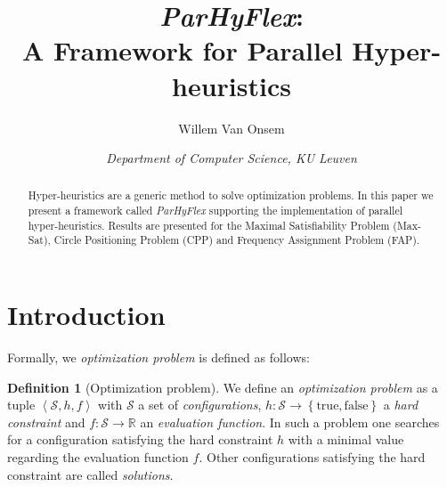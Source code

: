 \documentclass[a4paper,10pt]{article}
\title{\emph{ParHyFlex}:\\A Framework for Parallel Hyper-heuristics}
\author{Willem Van Onsem}%
\date{\textit{Department of Computer Science, KU Leuven}}%
\newcommand{\seclab}[1]{\label{sec:#1}}
\newcommand{\tupl}[1]{\ensuremath{\left\langle #1 \right\rangle}}
\newcommand{\accl}[1]{\ensuremath{\left\{ #1 \right\}}}
\newcommand{\BoolSet}{\accl{\mbox{true},\mbox{false}}}
\newcommand{\calS}{\ensuremath{\mathcal{S}}}
\newcommand{\RR}{\ensuremath{\mathbb{R}}}
\theoremstyle{definition}
\newtheorem{definition}{Definition}
\begin{document}
\ttl
\thispagestyle{empty}


\begin{abstract}
\noindent
Hyper-heuristics are a generic method to solve optimization problems. In this paper we present a framework called \emph{ParHyFlex} supporting the implementation of parallel hyper-heuristics. Results are presented for the Maximal Satisfiability Problem (Max-Sat), Circle Positioning Problem (CPP) and Frequency Assignment Problem (FAP).
\end{abstract}

\section{Introduction}
\seclab{hyper-heuristics}
Formally, we \emph{optimization problem} is defined as follows:
\begin{definition}[Optimization problem]
We define an \emph{optimization problem} as a tuple $\tupl{\calS,h,f}$ with $\calS$ a set of \emph{configurations}, $h:\calS\rightarrow\BoolSet$ a \emph{hard constraint} and $f:\calS\rightarrow\RR$ an \emph{evaluation function}. In such a problem one searches for a configuration satisfying the hard constraint $h$ with a minimal value regarding the evaluation function $f$. Other configurations satisfying the hard constraint are called \emph{solutions}.
\end{definition}
\end{document}
